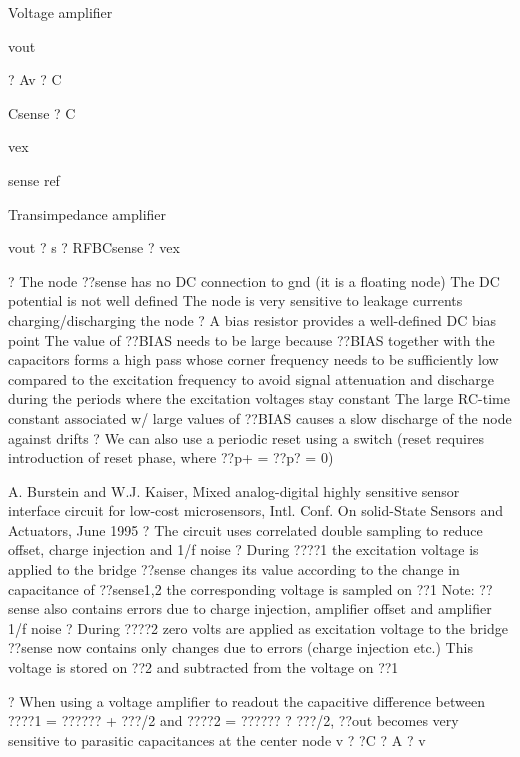 \documentclass[2pt,landscape]{article}
\begin{document}
\begin{multicols*}{5}
Voltage amplifier



vout


? Av ? C


Csense
?	C


vex


sense	ref




Transimpedance amplifier

vout ? s ? RFBCsense ? vex




?	The node ??sense has no DC connection to gnd (it is a \textbullet floating node\textbullet )
The DC potential is not well defined
\textbullet 	The node is very sensitive to leakage currents charging/discharging the node
?	A bias resistor provides a well-defined DC bias point
The value of ??BIAS  needs to be large because ??BIAS together with the 
capacitors forms a high pass whose corner frequency needs to be sufficiently 
low compared to the excitation frequency to avoid signal attenuation and 
discharge during the periods where the excitation voltages stay constant
\textbullet 	The large RC-time constant associated w/ large values of ??BIAS causes a 
slow discharge of the node against drifts
?	We can also use a periodic reset using a switch (reset requires 
introduction of reset phase, where ??p+ = ??p? = 0)




A. Burstein and W.J. Kaiser, \textbullet Mixed analog-digital highly sensitive sensor interface circuit for 
low-cost microsensors\textbullet , Intl. Conf. On solid-State Sensors and Actuators, June 1995
?	The circuit uses correlated double sampling to reduce offset, charge 
injection and 1/f noise
?	During ????1  the excitation voltage is applied to the bridge	??sense 
changes its value according to the change in capacitance of ??sense1,2 
the corresponding voltage is sampled on ??1
Note: ??sense also contains errors due to charge injection, amplifier offset 
and amplifier 1/f noise
?	During ????2 zero volts are applied as excitation voltage to the bridge
??sense now contains only changes due to errors (charge injection etc.) 
This voltage is stored on ??2 and subtracted from the voltage on ??1






?	When using a voltage amplifier to readout the capacitive difference between
????1 = ?????? + ???/2 and ????2 = ?????? ? ???/2, ??out becomes very sensitive to 
parasitic capacitances at the center node
v	?	?C	? A ? v




\end{multicols*}
\end{document}
